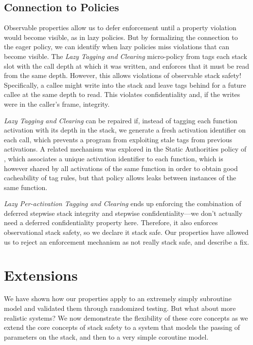\documentclass[acmsmall,review,anonymous]{acmart}\settopmatter{printfolios=true,printccs=false,printacmref=false}
\begin{document}
\subsection{Connection to Policies}

Observable properties allow us to defer enforcement until a property
violation would become visible, as in lazy policies. But by formalizing
the connection to the eager policy, we can identify when lazy policies
miss violations that can become visible. The {\em Lazy Tagging and Clearing}
micro-policy from \citet{DBLP:conf/sp/RoesslerD18} tags each stack slot with the call depth
at which it was written, and enforces that it must be read from the
same depth. However, this allows violations of observable stack safety!
Specifically, a callee might write into the stack and leave tags behind
for a future callee at the same depth to read. This violates confidentiality and,
if the writes were in the caller's frame, integrity.

{\em Lazy Tagging and Clearing} can be repaired if, instead of tagging each function
activation with its depth in the stack, we generate a fresh activation
identifier on each call, which prevents a program from exploiting stale
tags from previous activations. A related mechanism was explored in the
Static Authorities policy of \citet{DBLP:conf/sp/RoesslerD18}, which
associates a unique activation identifier to each function, which is
however shared by all activations of the same function in order to obtain
good cacheability of tag rules, but that policy allows leaks between
instances of the same function.

{\em Lazy Per-activation Tagging and Clearing} ends up enforcing the combination
of deferred stepwise stack integrity and stepwise confidentiality---we
don't actually need a deferred confidentiality property here. Therefore,
it also enforces observational stack safety, so we declare it stack safe.
Our properties have allowed us to reject an enforcement mechanism as
not really stack safe, and describe a fix.

\section{Extensions}
\label{sec:ext}

We have shown how our properties apply to an extremely simply
subroutine model and validated them through randomized testing.
But what about more realistic systems? We now demonstrate the
flexibility of these core concepts as we extend
the core concepts of stack safety to a system that models the passing of
parameters on the stack, and then to a very simple coroutine model.
\end{document}
